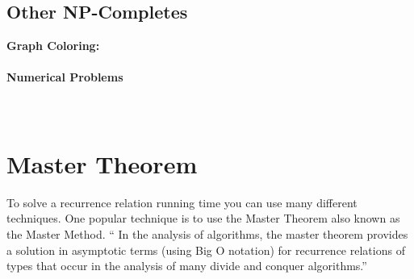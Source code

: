 \documentclass{article}
\begin{document}
\\

\subsection{Other NP-Completes}

\textbf{Graph Coloring:}\\

\\

\textbf{Numerical Problems}\\

\\

\\

\section{Master Theorem}
To solve a recurrence relation running time you can use many different techniques. One popular technique is to use the Master Theorem also known as the Master Method. “ In the analysis of algorithms, the master theorem provides a solution in asymptotic terms (using Big O notation) for recurrence relations of types that occur in the analysis of many divide and conquer algorithms.”
\end{document}

